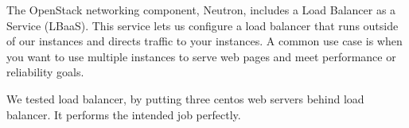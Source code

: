     \par The OpenStack networking component, Neutron, includes a Load Balancer as a Service (LBaaS). This service lets us configure a load balancer\cite{lb} that runs outside of our instances and directs traffic to your instances. A common use case is when you want to use multiple instances to serve web pages and meet performance or reliability goals.
    
    \par We tested load balancer, by putting three centos web servers behind load balancer. It performs the intended job perfectly.